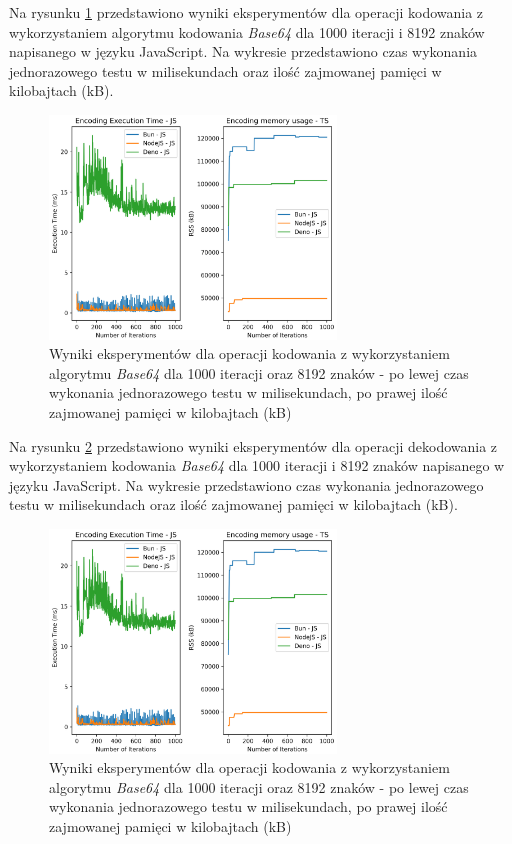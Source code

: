 Na rysunku \ref{fig:encoding_e2_js} przedstawiono wyniki eksperymentów dla operacji kodowania z wykorzystaniem algorytmu kodowania \textit{Base64} dla 1000 iteracji i 8192 znaków napisanego w języku JavaScript. Na wykresie przedstawiono czas wykonania jednorazowego testu w milisekundach oraz ilość zajmowanej pamięci w kilobajtach (kB).

\begin{figure}[H]
  \centering
  \includegraphics[width=0.68\textwidth]{Figures/coding/base64_1000_encoding_js.png}
  \caption{Wyniki eksperymentów dla operacji kodowania z wykorzystaniem algorytmu \textit{Base64} dla 1000 iteracji oraz 8192 znaków - po lewej czas wykonania jednorazowego testu w milisekundach, po prawej ilość zajmowanej pamięci w kilobajtach (kB)}
  \label{fig:encoding_e2_js}
\end{figure}

Na rysunku \ref{fig:decoding_e2_js} przedstawiono wyniki eksperymentów dla operacji dekodowania z wykorzystaniem kodowania \textit{Base64} dla 1000 iteracji i 8192 znaków napisanego w języku JavaScript. Na wykresie przedstawiono czas wykonania jednorazowego testu w milisekundach oraz ilość zajmowanej pamięci w kilobajtach (kB).

\begin{figure}[H]
  \centering
  \includegraphics[width=0.68\textwidth]{Figures/coding/base64_1000_encoding_js.png}
  \caption{Wyniki eksperymentów dla operacji kodowania z wykorzystaniem algorytmu \textit{Base64} dla 1000 iteracji oraz 8192 znaków - po lewej czas wykonania jednorazowego testu w milisekundach, po prawej ilość zajmowanej pamięci w kilobajtach (kB)}
  \label{fig:decoding_e2_js}
\end{figure}

